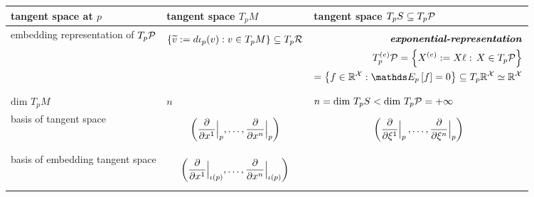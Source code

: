 \documentclass[11pt]{article}
\begin{document}
\begin{table}[h!]
\begin{tabularx}{1\textwidth} { 
  | >{\raggedright\arraybackslash} m{3cm}
  | >{\centering\arraybackslash}X
  | >{\centering\arraybackslash}X  | }
\hline
tangent space at $p$ &  \textbf{tangent space}  $T_{p}M$ & \textbf{tangent space}  $T_{p}S \subseteq T_{p}{\mathcal P}$ \\ 
\hline
embedding representation of $T_p{\mathcal P}$ & 
\begin{align*}
\left\{\widetilde{v} := d\iota_p(v): v \in T_pM\right\} \subseteq T_p{\mathcal R}
\end{align*}
&  \vspace{-1.5em}   
\begin{align*}
\text{\emph{\textbf{exponential-representation}}}\\
T_{p}^{(e)}\cP = \set{X^{(e)}:= X\ell:\, X \in T_p\cP}\\
 = \set{f \in \bR^{\cX}: \E{p}{f} =0} \subseteq T_p\bR^{\cX} \simeq \bR^{\cX}
\end{align*}  \vspace{-1.25em} \\
\hline
$\text{dim }T_pM$ & $n$ & $n=\text{dim }T_pS < \text{dim }T_p{\mathcal P} = +\infty$  \\
\hline
basis of tangent space & 
\vspace{-1.25em}
\begin{align*}
 \left(\dfrac{\partial}{\partial x^{1}}\Bigr|_{p}, \ldots, \dfrac{\partial}{\partial x^{n}}\Bigr|_{p}\right)
\end{align*}
\vspace{-1em}
&   
\vspace{-1.25em}
\begin{align*}
\begin{array}{c}
\left(\dfrac{\partial }{\partial \xi^{1}}\Bigr|_{p} \,{,}\ldots{,}\, \dfrac{\partial }{\partial \xi^{n}}\Bigr|_{p}\right)
\end{array}
\end{align*} \vspace{-1em}\\
\hline
basis of embedding tangent space & 
\vspace{-1.25em}
\begin{align*}
 \paren{\dfrac{\partial }{\partial x^{1}}\Bigr|_{\iota(p)}, \ldots, \dfrac{\partial}{\partial x^{n}}\Bigr|_{\iota(p)}}

\end{align*}
\end{tabularx}
\end{table}
\end{document}
